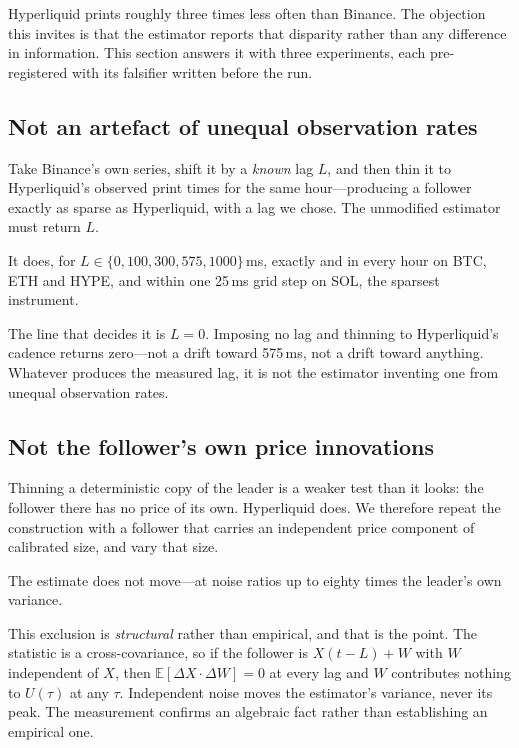 \documentclass[11pt,a4paper]{article}
\begin{document}
Hyperliquid prints roughly three times less often than Binance. The objection this invites is
that the estimator reports that disparity rather than any difference in information. This section
answers it with three experiments, each pre-registered with its falsifier written before the run.

\subsection{Not an artefact of unequal observation rates}

Take Binance's own series, shift it by a \emph{known} lag $L$, and then thin it to Hyperliquid's
observed print times for the same hour---producing a follower exactly as sparse as Hyperliquid,
with a lag we chose. The unmodified estimator must return $L$.

It does, for $L \in \{0, 100, 300, 575, 1000\}$\,ms, exactly and in every hour on BTC, ETH and
HYPE, and within one 25\,ms grid step on SOL, the sparsest instrument.

The line that decides it is $L = 0$. Imposing no lag and thinning to Hyperliquid's cadence returns
zero---not a drift toward 575\,ms, not a drift toward anything. Whatever produces the measured lag,
it is not the estimator inventing one from unequal observation rates.

\subsection{Not the follower's own price innovations}

Thinning a deterministic copy of the leader is a weaker test than it looks: the follower there has
no price of its own. Hyperliquid does. We therefore repeat the construction with a follower that
carries an independent price component of calibrated size, and vary that size.

The estimate does not move---at noise ratios up to eighty times the leader's own variance.

This exclusion is \emph{structural} rather than empirical, and that is the point. The statistic is
a cross-covariance, so if the follower is $X(t - L) + W$ with $W$ independent of $X$, then
$\mathbb{E}[\Delta X \cdot \Delta W] = 0$ at every lag and $W$ contributes nothing to $U(\tau)$ at
any $\tau$. Independent noise moves the estimator's variance, never its peak. The measurement
confirms an algebraic fact rather than establishing an empirical one.
\end{document}
